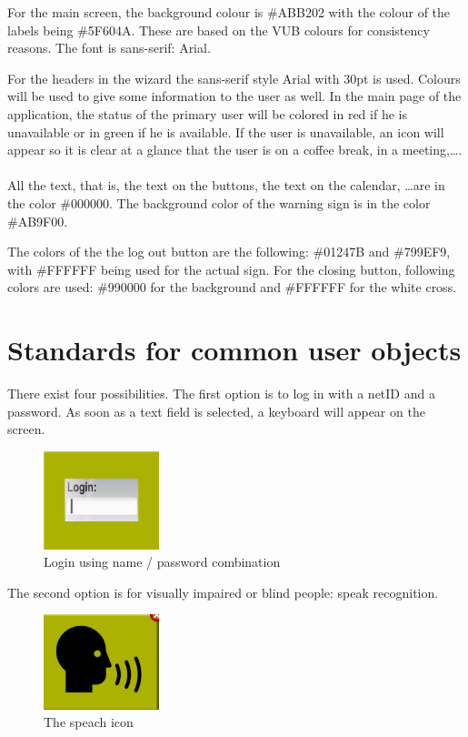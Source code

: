 \documentclass[11pt, a4paper,svglistings]{report}
\begin{document}
For the main screen, the background colour is \#ABB202 with the colour of the labels being \#5F604A. These are based on the VUB colours for consistency reasons. The font is sans-serif: Arial.

For the headers in the wizard the sans-serif style Arial with 30pt is used.
Colours will be used to give some information to the user as well. In the main page of the application, the status of the primary user will be colored in red if he is unavailable or in green if he is available. If the user is unavailable, an icon will appear so it is clear at a glance that the user is on a coffee break, in a meeting,\ldots. \\ \\
All the text, that is, the text on the buttons, the text on the calendar, \ldots are in the color \#000000. The background color of the warning sign is in the color \#AB9F00.

The colors of the the log out button are the following: \#01247B and \#799EF9, with \#FFFFFF being used for the actual sign. For the closing button, following colors are used: \#990000 for the background and \#FFFFFF for the white cross.

\section{Standards for common user objects}

There exist four possibilities. The first option is to log in with a netID and a password. As soon as a text field is selected, a keyboard will appear on the screen.

\begin{figure}[H]
\centering
    \includegraphics[width=0.3\textwidth]{NamePass.png}
  \caption[Name / password login]{Login using name / password combination}
\end{figure}

The second option is for visually impaired or blind people: speak recognition.

\begin{figure}[H]
\centering
    \includegraphics[width=0.3\textwidth]{Speak.png}
  \caption[Speach icon]{The speach icon}
\end{figure}
\end{document}

